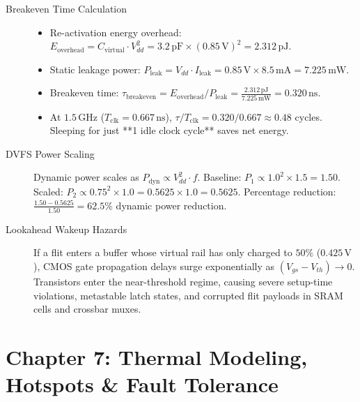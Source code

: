 \begin{description}
    \item[Breakeven Time Calculation]
    \begin{itemize}
        \item Re-activation energy overhead: $E_{\mathrm{overhead}} = C_{\mathrm{virtual}} \cdot V_{dd}^2 = 3.2\,\mathrm{pF} \times (0.85\,\mathrm{V})^2 = 2.312\,\mathrm{pJ}$.
        \item Static leakage power: $P_{\mathrm{leak}} = V_{dd} \cdot I_{\mathrm{leak}} = 0.85\,\mathrm{V} \times 8.5\,\mathrm{mA} = 7.225\,\mathrm{mW}$.
        \item Breakeven time: $\tau_{\mathrm{breakeven}} = E_{\mathrm{overhead}} / P_{\mathrm{leak}} = \frac{2.312\,\mathrm{pJ}}{7.225\,\mathrm{mW}} = 0.320\,\mathrm{ns}$.
        \item At $1.5\,\mathrm{GHz}$ ($T_{\mathrm{clk}} = 0.667\,\mathrm{ns}$), $\tau / T_{\mathrm{clk}} = 0.320 / 0.667 \approx 0.48$ cycles. Sleeping for just **1 idle clock cycle** saves net energy.
    \end{itemize}

    \item[DVFS Power Scaling] Dynamic power scales as $P_{\mathrm{dyn}} \propto V_{dd}^2 \cdot f$.
    Baseline: $P_1 \propto 1.0^2 \times 1.5 = 1.50$.
    Scaled: $P_2 \propto 0.75^2 \times 1.0 = 0.5625 \times 1.0 = 0.5625$.
    Percentage reduction: $\frac{1.50 - 0.5625}{1.50} = \mathbf{62.5\%}$ dynamic power reduction.

    \item[Lookahead Wakeup Hazards] If a flit enters a buffer whose virtual rail has only charged to $50\%$ ($0.425\,\mathrm{V}$), CMOS gate propagation delays surge exponentially as $(V_{gs} - V_{th}) \to 0$. Transistors enter the near-threshold regime, causing severe setup-time violations, metastable latch states, and corrupted flit payloads in SRAM cells and crossbar muxes.
\end{description}

\section*{Chapter 7: Thermal Modeling, Hotspots \& Fault Tolerance}

